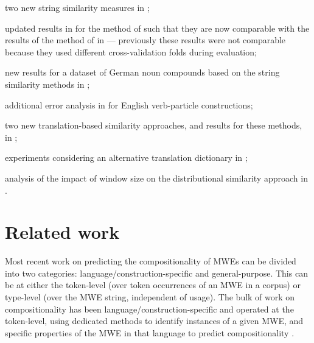\documentclass[output=paper
,modfonts
,nonflat]{langsci/langscibook}
\begin{document}
\begin{compactitem}
\item two new string similarity measures in
  ;
\item updated results in  for the method of
  \cite{salehi2013} such that they are now comparable with the results
  of the method of \cite{DBLP:conf/eacl/SalehiCB14} in
   --- previously these results were not
  comparable because they used different cross-validation folds during
  evaluation;
\item new results for a dataset of German noun compounds
  based on the string similarity methods in ;
\item additional error analysis in  for
  English verb-particle constructions;
\item two new translation-based similarity approaches, and results
  for these methods, in ;
\item experiments considering an alternative translation dictionary in
  ;
\item analysis of the impact of window size on the distributional
  similarity approach in .
\end{compactitem}

\section{Related work}
\label{sec:RW}


Most recent work on predicting the compositionality of MWEs can be
divided into two categories: language/construction-specific and
general-purpose. This can be at either the token-level (over token
occurrences of an MWE in a corpus) or type-level (over the MWE string,
independent of usage). The bulk of work on compositionality has been
language/construction-specific and operated at the token-level, using
dedicated methods to identify instances of a given MWE, and specific
properties of the MWE in that language to predict compositionality
\citep{lin1999,kim2007,fazly-cook-stevenson:2009:CL}.
\end{document}
